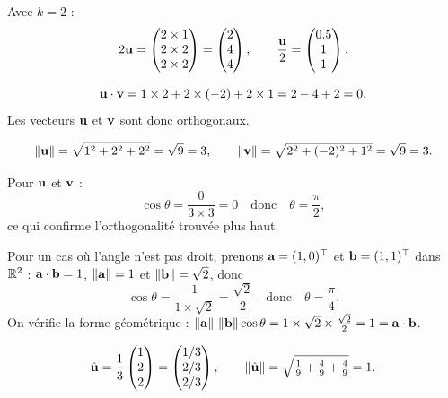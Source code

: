 \begin{example}
Avec $k = 2$ :
\[
    2\mathbf{u} =
    \begin{pmatrix} 2 \times 1 \\ 2 \times 2 \\ 2 \times 2 \end{pmatrix}
    = \begin{pmatrix} 2 \\ 4 \\ 4 \end{pmatrix},
    \qquad
    \frac{\mathbf{u}}{2} =
    \begin{pmatrix} \num{0.5} \\ 1 \\ 1 \end{pmatrix}.
\]
\end{example}

\begin{example}
\[
    \mathbf{u} \cdot \mathbf{v}
    = 1 \times 2 + 2 \times (-2) + 2 \times 1
    = 2 - 4 + 2 = 0.
\]
Les vecteurs $\mathbf{u}$ et $\mathbf{v}$ sont donc
orthogonaux.
\end{example}

\begin{example}[Norme]
\[
    \left\|\mathbf{u}\right\| = \sqrt{1^2 + 2^2 + 2^2}
    = \sqrt{9} = 3,
    \qquad
    \left\|\mathbf{v}\right\| = \sqrt{2^2 + (-2)^2 + 1^2}
    = \sqrt{9} = 3.
\]
\end{example}

\begin{example}
Pour $\mathbf{u}$ et $\mathbf{v}$ :
\[
    \cos\theta = \frac{0}{3 \times 3} = 0
    \quad\text{donc}\quad
    \theta = \frac{\pi}{2},
\]
ce qui confirme l'orthogonalité trouvée plus haut.

Pour un cas où l'angle n'est pas droit, prenons
$\mathbf{a} = (1, 0)^\top$ et $\mathbf{b} = (1, 1)^\top$
dans $\mathbb{R}^2$ : $\mathbf{a} \cdot \mathbf{b} = 1$,
$\left\|\mathbf{a}\right\| = 1$ et $\left\|\mathbf{b}\right\| = \sqrt{2}$, donc
\[
    \cos\theta = \frac{1}{1 \times \sqrt{2}} = \frac{\sqrt{2}}{2}
    \quad\text{donc}\quad
    \theta = \frac{\pi}{4}.
\]
On vérifie la forme géométrique :
$\left\|\mathbf{a}\right\|\,\left\|\mathbf{b}\right\|\cos\theta
= 1 \times \sqrt{2} \times \frac{\sqrt{2}}{2} = 1
= \mathbf{a} \cdot \mathbf{b}$.
\end{example}

\begin{example}[Normalisation]
\[
    \hat{\mathbf{u}} = \frac{1}{3}\begin{pmatrix} 1 \\ 2 \\ 2 \end{pmatrix}
    = \begin{pmatrix} 1/3 \\ 2/3 \\ 2/3 \end{pmatrix},
    \qquad
    \left\|\hat{\mathbf{u}}\right\|
    = \sqrt{\tfrac{1}{9} + \tfrac{4}{9} + \tfrac{4}{9}} = 1.
\]
\end{example}

